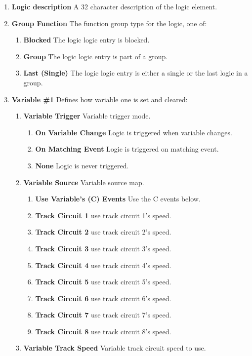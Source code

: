 \begin{enumerate}
\item \textbf{Logic description} A 32 character description of the logic 
element.
\item \textbf{Group Function} The function group type for the logic, one of:
\begin{enumerate}
\item \textbf{Blocked} The logic logic entry is blocked.
\item \textbf{Group} The logic logic entry is part of a group.
\item \textbf{Last (Single)} The logic logic entry is either a single or the 
last logic in a group.
\end{enumerate}
\item \textbf{Variable \#1} Defines how variable one is set and cleared:
\begin{enumerate}
\item \textbf{Variable Trigger} Variable trigger mode.
\begin{enumerate}
\item \textbf{On Variable Change} Logic is triggered when variable changes.
\item \textbf{On Matching Event} Logic is triggered on matching event.
\item \textbf{None} Logic is never triggered.
\end{enumerate}
\item \textbf{Variable Source} Variable source map.
\begin{enumerate}
\item \textbf{Use Variable's (C) Events} Use the C events below.
\item \textbf{Track Circuit 1} use track circuit 1's speed.
\item \textbf{Track Circuit 2} use track circuit 2's speed.
\item \textbf{Track Circuit 3} use track circuit 3's speed.
\item \textbf{Track Circuit 4} use track circuit 4's speed.
\item \textbf{Track Circuit 5} use track circuit 5's speed.
\item \textbf{Track Circuit 6} use track circuit 6's speed.
\item \textbf{Track Circuit 7} use track circuit 7's speed.
\item \textbf{Track Circuit 8} use track circuit 8's speed.
\end{enumerate}
\item \textbf{Variable Track Speed} Variable track circuit speed to use.

\end{enumerate}
\end{enumerate}
